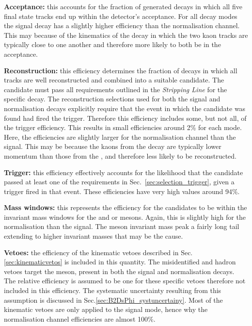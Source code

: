 \begin{description}

\item \textbf{Acceptance:} this accounts for the fraction of generated decays in which all five final state tracks end up within the \lhcb detector's acceptance. For all \Dsp decay modes the signal decay has a slightly higher efficiency than the normalisation channel. This may because of the kinematics of the \decay{\phiz}{\Kp\Km} decay in which the two kaon tracks are typically close to one another and therefore more likely to both be in the acceptance.   

\item \textbf{Reconstruction:} this efficiency determines the fraction of decays in which all tracks are well reconstructed and combined into a suitable candidate. The candidate must pass all requirements outlined in the \emph{Stripping Line} for the specific decay. The reconstruction selections used for both the signal and normalisation decays explicitly require that the event in which the candidate was found had fired the trigger. Therefore this efficiency includes some, but not all, of the trigger efficiency. This results in small efficiencies around 2\% for each mode. Here, the efficiencies are slightly larger for the normalisation channel than the signal. This may be because the kaons from the \phiz decay are typically lower momentum than those from the \Dzb, and therefore less likely to be reconstructed.  

\item \textbf{Trigger:} this efficiency effectively accounts for the likelihood that the candidate passed at least one of the requirements in Sec.~\ref{sec:selection_trigger}, given a trigger fired in that event. These efficiencies have very high values around 94\%.  

\item \textbf{Mass windows:} this represents the efficiency for the candidates to be within the invariant mass windows for the \Dsp and \phiz or \Dzb mesons. Again, this is slightly high for the normalisation than the signal. The \phiz meson invariant mass peak a fairly long tail extending to higher invariant masses that may be the cause.  

\item \textbf{Vetoes:} the efficiency of the kinematic vetoes described in Sec.\ref{sec:kinematicvetos} is included in this quantity. The misidentified \D and \Lc hadron vetoes target the \Dsp meson, present in both the signal and normalisation decays. The relative efficiency is assumed to be one for these specific vetoes therefore not included in this efficiency. The systematic uncertainty resulting from this assumption is discussed in Sec.\ref{sec:B2DsPhi_systuncertainy}. Most of the kinematic vetoes are only applied to the signal mode, hence why the normalisation channel efficiencies are almost 100\%.


\end{description}
